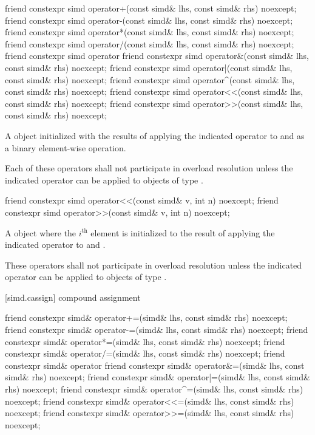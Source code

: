 \begin{itemdecl}
friend constexpr simd operator+(const simd& lhs, const simd& rhs) noexcept;
friend constexpr simd operator-(const simd& lhs, const simd& rhs) noexcept;
friend constexpr simd operator*(const simd& lhs, const simd& rhs) noexcept;
friend constexpr simd operator/(const simd& lhs, const simd& rhs) noexcept;
friend constexpr simd operator%
friend constexpr simd operator&(const simd& lhs, const simd& rhs) noexcept;
friend constexpr simd operator|(const simd& lhs, const simd& rhs) noexcept;
friend constexpr simd operator^(const simd& lhs, const simd& rhs) noexcept;
friend constexpr simd operator<<(const simd& lhs, const simd& rhs) noexcept;
friend constexpr simd operator>>(const simd& lhs, const simd& rhs) noexcept;
\end{itemdecl}

\begin{itemdescr}
  \pnum\returns
  A  object initialized with the results of applying the indicated operator to  and  as a binary element-wise operation.

  \pnum\remarks
  Each of these operators shall not participate in overload resolution unless the indicated operator can be applied to objects of type .
\end{itemdescr}

\begin{itemdecl}
friend constexpr simd operator<<(const simd& v, int n) noexcept;
friend constexpr simd operator>>(const simd& v, int n) noexcept;
\end{itemdecl}

\begin{itemdescr}
  \pnum\returns
  A  object where the $i^\text{th}$ element is initialized to the result of applying the indicated operator to  and  \foralli.

  \pnum\remarks
  These operators shall not participate in overload resolution unless the indicated operator can be applied to objects of type .
\end{itemdescr}

[simd.cassign]{ compound assignment}

\begin{itemdecl}
friend constexpr simd& operator+=(simd& lhs, const simd& rhs) noexcept;
friend constexpr simd& operator-=(simd& lhs, const simd& rhs) noexcept;
friend constexpr simd& operator*=(simd& lhs, const simd& rhs) noexcept;
friend constexpr simd& operator/=(simd& lhs, const simd& rhs) noexcept;
friend constexpr simd& operator%
friend constexpr simd& operator&=(simd& lhs, const simd& rhs) noexcept;
friend constexpr simd& operator|=(simd& lhs, const simd& rhs) noexcept;
friend constexpr simd& operator^=(simd& lhs, const simd& rhs) noexcept;
friend constexpr simd& operator<<=(simd& lhs, const simd& rhs) noexcept;
friend constexpr simd& operator>>=(simd& lhs, const simd& rhs) noexcept;
\end{itemdecl}

